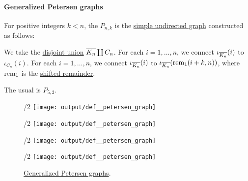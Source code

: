 \paragraph{Generalized Petersen graphs}

\begin{definition}\label{def:petersen_graph}
  For positive integers \( k < n \), the  \( P_{n,k} \) is the \hyperref[def:undirected_graph]{simple undirected graph} constructed as follows:
  \begin{thmenum}
     We take the \hyperref[def:graph_disjoint_union]{disjoint union} \( \oline{K_n} \coprod C_n \).
     For each \( i = 1, \ldots, n \), we connect \( \iota_{\oline{K_n}}(i) \) to \( \iota_{C_n}(i) \).
     For each \( i = 1, \ldots, n \), we connect \( \iota_{\oline{K_n}}(i) \) to \( \iota_{\oline{K_n}}(\rem_1(i + k, n)) \), where \( \operatorname{rem}_1 \) is the \hyperref[rem:shifted_remainder]{shifted remainder}.
  \end{thmenum}

  The usual  is \( P_{5,2} \).

  \begin{figure}[!ht]
    \begin{subcaptionblock}{\textwidth/2}
      \centering
      \texttt{[image: output/def\_\_petersen\_graph]}
      \caption{\( P_{5,2} \)}\label{fig:def:petersen_graph/p52}
    \end{subcaptionblock}
    \hfill
    \begin{subcaptionblock}{\textwidth/2}
      \centering
      \texttt{[image: output/def\_\_petersen\_graph]}
      \caption{\( P_{7,3} \)}\label{fig:def:petersen_graph/p73}
    \end{subcaptionblock}
    \par
    \begin{subcaptionblock}{\textwidth/2}
      \centering
      \texttt{[image: output/def\_\_petersen\_graph]}
      \caption{\( P_{3,1} \)}\label{fig:def:petersen_graph/p31}
    \end{subcaptionblock}
    \hfill
    \begin{subcaptionblock}{\textwidth/2}
      \centering
      \texttt{[image: output/def\_\_petersen\_graph]}
      \caption{\( P_{2,1} \)}\label{fig:def:petersen_graph/p21}
    \end{subcaptionblock}

    \caption{\hyperref[def:petersen_graph]{Generalized Petersen graphs}.}\label{fig:def:petersen_graph}
  \end{figure}
\end{definition}

